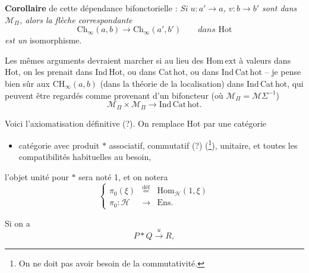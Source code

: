 \documentclass[11pt]{article}
\newcommand{\msp}[1]{\marginpar{\footnotesize [#1]}}
\newcommand{\Ch}{\mathrm{Ch}}
\newcommand{\Hot}{\mathrm{Hot}}
\newcommand{\Hom}{\mathrm{Hom}}
\begin{document}
\textbf{Corollaire} de cette dépendance bifonctorielle : \textit{Si $u : a' \longrightarrow a$, $v : b \longrightarrow b'$ sont dans $\mathcal{M}_\Pi$, alors la flèche correspondante}
\[
\Ch_\infty(a,b) \longrightarrow \Ch_\infty(a',b') \qquad \textit{dans } \Hot
\]
\textit{est un} isomorphisme.

Les mêmes arguments devraient marcher si au lieu des $\Hom\,\mathrm{ext}$ à valeurs dans Hot, on les prenait dans Ind\,Hot, ou dans Cat\,hot, ou dans Ind\,Cat\,hot -- je pense bien sûr aux $\mathrm{CH}_\infty(a,b)$ (dans la théorie de la localisation) dans Ind\,Cat\,hot, qui peuvent être regardés comme provenant d'un bifoncteur (où $\mathcal{M}_\Pi = \mathcal{M}\Sigma^{-1}$)
\[
\mathcal{M}_\Pi \times \mathcal{M}_\Pi \longrightarrow \mathrm{Ind}\,\mathrm{Cat}\,\mathrm{hot}.
\]

\msp{page 5}
Voici l'axiomatisation définitive (?). On remplace Hot par une catégorie

\begin{itemize}[label={$\mathcal{H}$,}]
\item catégorie avec produit $*$ associatif, commutatif (?) (\footnote{On ne doit pas avoir besoin de la commutativité.}), unitaire, et toutes les compatibilités habituelles au besoin,
\end{itemize}

l'objet unité pour $*$ sera noté 1, et on notera
\[
\left\{
\begin{array}{ccc}
\pi_0(\xi) & \overset{\text{déf}}{=} & \Hom_{\mathcal{H}}(1,\xi) \\[1ex]
\pi_0 : \mathcal{H} & \longrightarrow & \mathrm{Ens}.
\end{array}
\right.
\]

Si on a
\[
P * Q \xrightarrow{\ u\ } R,
\]
\end{document}
